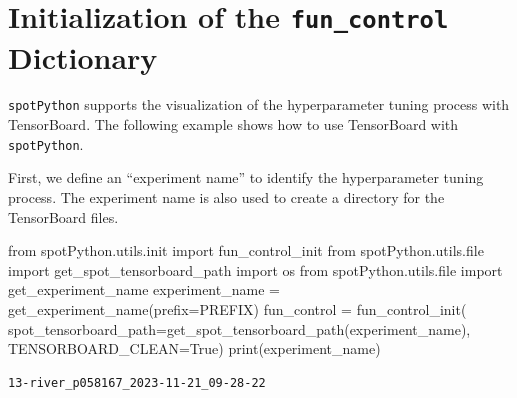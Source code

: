 \documentclass[
  letterpaper,
  DIV=11,
  numbers=noendperiod]{scrreprt}
\newenvironment{Shaded}{\begin{snugshade}}{\end{snugshade}}
\newcommand{\BuiltInTok}[1]{\textcolor[rgb]{0.00,0.23,0.31}{#1}}
\newcommand{\ImportTok}[1]{\textcolor[rgb]{0.00,0.46,0.62}{#1}}
\newcommand{\NormalTok}[1]{\textcolor[rgb]{0.00,0.23,0.31}{#1}}
\newcommand{\OperatorTok}[1]{\textcolor[rgb]{0.37,0.37,0.37}{#1}}
\newcommand{\VariableTok}[1]{\textcolor[rgb]{0.07,0.07,0.07}{#1}}
\begin{document}
\hypertarget{initialization-of-the-fun_control-dictionary}{%
\section{\texorpdfstring{Initialization of the \texttt{fun\_control}
Dictionary}{Initialization of the fun\_control Dictionary}}\label{initialization-of-the-fun_control-dictionary}}

\texttt{spotPython} supports the visualization of the hyperparameter
tuning process with TensorBoard. The following example shows how to use
TensorBoard with \texttt{spotPython}.

First, we define an ``experiment name'' to identify the hyperparameter
tuning process. The experiment name is also used to create a directory
for the TensorBoard files.

\begin{Shaded}
\begin{Highlighting}[]
\ImportTok{from}\NormalTok{ spotPython.utils.init }\ImportTok{import}\NormalTok{ fun\_control\_init}
\ImportTok{from}\NormalTok{ spotPython.utils.}\BuiltInTok{file} \ImportTok{import}\NormalTok{ get\_spot\_tensorboard\_path}
\ImportTok{import}\NormalTok{ os}
\ImportTok{from}\NormalTok{ spotPython.utils.}\BuiltInTok{file} \ImportTok{import}\NormalTok{ get\_experiment\_name}
\NormalTok{experiment\_name }\OperatorTok{=}\NormalTok{ get\_experiment\_name(prefix}\OperatorTok{=}\NormalTok{PREFIX)}
\NormalTok{fun\_control }\OperatorTok{=}\NormalTok{ fun\_control\_init(}
\NormalTok{    spot\_tensorboard\_path}\OperatorTok{=}\NormalTok{get\_spot\_tensorboard\_path(experiment\_name),}
\NormalTok{    TENSORBOARD\_CLEAN}\OperatorTok{=}\VariableTok{True}\NormalTok{)}
\BuiltInTok{print}\NormalTok{(experiment\_name)}
\end{Highlighting}
\end{Shaded}

\begin{verbatim}
13-river_p058167_2023-11-21_09-28-22
\end{verbatim}
\end{document}
